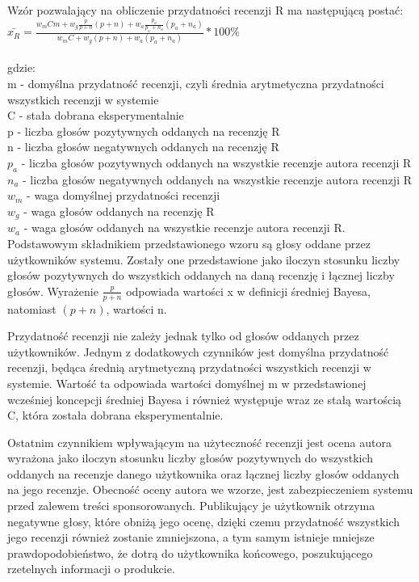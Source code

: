 Wzór pozwalający na obliczenie przydatności recenzji R ma następującą postać:\\

$\bar{x_{R}}=\frac{w_{m}Cm+w_{g}\frac{p}{p+n}(p+n)+w_{a}\frac{p_{a}}{p_{a}+n_{a}}(p_{a}+n_{a})}{w_{m}C+w_{g}(p+n)+w_{a}(p_{a}+n_{a})}*100\%$\\\\
gdzie:\\
m - domyślna przydatność recenzji, czyli średnia arytmetyczna przydatności wszystkich recenzji w systemie\\
C - stała dobrana eksperymentalnie\\
p - liczba głosów pozytywnych oddanych na recenzję R\\
n - liczba głosów negatywnych oddanych na recenzję R\\
$p_{a}$ - liczba głosów pozytywnych oddanych na wszystkie recenzje autora recenzji R\\
$n_{a}$ - liczba głosów negatywnych oddanych na wszystkie recenzje autora recenzji R\\
$w_{m}$ - waga domyślnej przydatności recenzji\\
$w_{g}$ - waga głosów oddanych na recenzję R\\
$w_{a}$ - waga głosów oddanych na wszystkie recenzje autora recenzji R.\\


Podstawowym składnikiem przedstawionego wzoru są głosy oddane przez użytkowników systemu. Zostały one przedstawione jako iloczyn stosunku liczby głosów pozytywnych do wszystkich oddanych na daną recenzję i łącznej liczby głosów. Wyrażenie $\frac{p}{p+n}$ odpowiada wartości x w definicji średniej Bayesa, natomiast $(p + n)$, wartości n.

Przydatność recenzji nie zależy jednak tylko od głosów oddanych przez użytkowników. Jednym z dodatkowych czynników jest domyślna przydatność recenzji, będąca średnią arytmetyczną przydatności wszystkich recenzji w systemie. Wartość ta odpowiada wartości domyślnej m w przedstawionej wcześniej koncepcji średniej Bayesa i również występuje wraz ze stałą wartością C, która została dobrana eksperymentalnie.

Ostatnim czynnikiem wpływającym na użyteczność recenzji jest ocena autora wyrażona jako iloczyn stosunku liczby głosów pozytywnych do wszystkich oddanych na recenzje danego użytkownika oraz łącznej liczby głosów oddanych na jego recenzje. Obecność oceny autora we wzorze, jest zabezpieczeniem systemu przed zalewem treści sponsorowanych. Publikujący je użytkownik otrzyma negatywne głosy, które obniżą jego ocenę, dzięki czemu przydatność wszystkich jego recenzji również zostanie zmniejszona, a tym samym istnieje mniejsze prawdopodobieństwo, że dotrą do użytkownika końcowego, poszukującego rzetelnych informacji o produkcie. 

